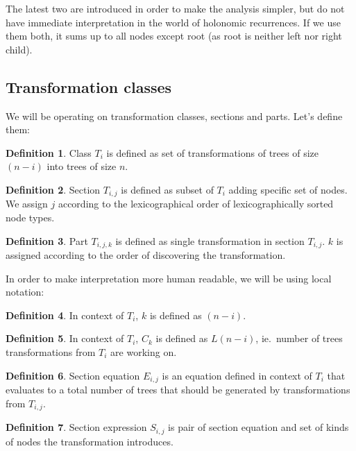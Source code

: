 \documentclass[final]{article}
\theoremstyle{definition}
\newtheorem{definition}{Definition}[subsection]
\theoremstyle{remark}
\begin{document}
The latest two are introduced in order to make the analysis simpler, but do not have immediate interpretation in the world of holonomic recurrences. If we use them both, it sums up to all nodes except root (as root is neither left nor right child).


\subsection{Transformation classes}%
\label{sub:transformation_classes}

We will be operating on transformation classes, sections and parts. Let's define them:

\begin{definition}
    Class \(T_i\) is defined as set of transformations of trees of size \((n - i)\) into trees of size \(n\).
\end{definition}

\begin{definition}
    Section \(T_{i,j}\) is defined as subset of \(T_i\) adding specific set of nodes. We assign \(j\) according to the lexicographical order of lexicographically sorted node types.
\end{definition}

\begin{definition}
    Part \(T_{i,j,k}\) is defined as single transformation in section \(T_{i,j}\). \(k\) is assigned according to the order of discovering the transformation.
\end{definition}

In order to make interpretation more human readable, we will be using local notation:

\begin{definition}
    In context of \(T_i\), \(k\) is defined as \((n - i)\).
\end{definition}

\begin{definition}
    In context of \(T_i\), \(C_k\) is defined as \(L(n - i)\), ie.\ number of trees transformations from \(T_i\) are working on.
\end{definition}

\begin{definition}
    Section equation \(E_{i, j}\) is an equation defined in context of \(T_i\) that evaluates to a total number of trees that should be generated by transformations from \(T_{i, j}\).
\end{definition}

\begin{definition}
    Section expression \(S_{i, j}\) is pair of section equation and set of kinds of nodes the transformation introduces.
\end{definition}
\end{document}
